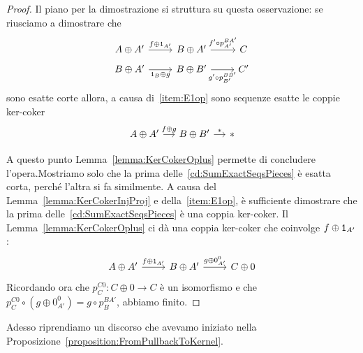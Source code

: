 \begin{proof}
  Il piano per la dimostrazione si struttura su questa osservazione: se
  riusciamo a dimostrare che
  \begin{equation}
    \begin{tikzcd}[row sep=tiny]
      A \oplus A' \ar["{f \oplus \id_{A'}}", r] & B \oplus A' \ar["{f' \circ
        p_{A'}^{BA'}}",
      r] & C \\
      B \oplus A' \ar["{\id_B \oplus g}", r, swap] & B \oplus B' \ar["{g'
        \circ p_{B'}^{BB'}}", r, swap] & C'
    \end{tikzcd}
    \label{cd:SumExactSeqsPieces}
  \end{equation}
  sono esatte corte allora, a causa di~\ref{item:E1op} sono sequenze
  esatte le coppie ker-coker
  \[
    \begin{tikzcd}[column sep=small, row sep=tiny]
      A \oplus A' \ar["{f \oplus g}", r] & B \oplus B' \ar["\ast",
      r] & \ast \\
    \end{tikzcd}
  \]
  A questo punto Lemma~\ref{lemma:KerCokerOplus} permette di concludere
  l'opera.\newline Mostriamo solo che la prima
  delle~\eqref{cd:SumExactSeqsPieces} è esatta corta, perché l'altra si
  fa similmente. A causa del Lemma~\ref{lemma:KerCokerInjProj} e
  della~\ref{item:E1op}, è sufficiente dimostrare che la prima
  delle~\ref{cd:SumExactSeqsPieces} è una coppia ker-coker. Il
  Lemma~\ref{lemma:KerCokerOplus} ci dà una coppia ker-coker che
  coinvolge \(f \oplus \mathtt 1_{A'}\):
  \[
    \begin{tikzcd}
      A \oplus A' \ar["{f \oplus \id_{A'}}", r] & B \oplus A' \ar["{g \oplus
        0_{A'}^0}", r] & C \oplus 0
    \end{tikzcd}
  \]
  Ricordando ora che \(p_{C}^{C0} : C \oplus 0 \to C\) è un
  isomorfismo e che
  \(p_{C}^{C0} \circ \left( g \oplus 0_{A'}^0 \right) = g \circ
  p_{B}^{BA'}\), abbiamo finito.
\end{proof}

Adesso riprendiamo un discorso che avevamo iniziato nella
Proposizione~\ref{proposition:FromPullbackToKernel}.


